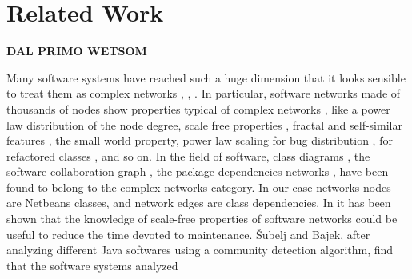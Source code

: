 \section{Related Work}
\label{sec:related work}

\textbf{DAL PRIMO WETSOM}

Many software systems have reached such a huge dimension that it looks sensible to treat them as 
complex networks \cite{Focardi:2001}, \cite{Myers:2003}, \cite{Turnu:2011}. 
In particular, software networks made of thousands of nodes 
show properties typical of complex networks \cite{Barabasi:2000}, like 
a power law distribution of the node degree, scale free properties \cite{Song:2005}, fractal and self-similar features
\cite{Turnu:2012}, the small world property, power law scaling for 
bug distribution \cite{TSE:2011}, for refactored classes \cite{CSMR:2012}, 
and so on. 
In the field of software, class diagrams \cite{Valverde:2002, Valverde:2003}, 
the software 
collaboration graph \cite{Myers:2003}, the package dependencies networks \cite{Challet:2004}, 
have been found to belong to the complex networks category.
In our case networks nodes are Netbeans classes, and network edges 
are class dependencies.
%
In \cite{Wen:2007} it has been shown that the knowledge of scale-free properties of software networks
could be useful to reduce the time devoted to maintenance. 
\v{S}ubelj and Bajek, after analyzing different Java softwares using a community detection algorithm, find that the software systems analyzed 
